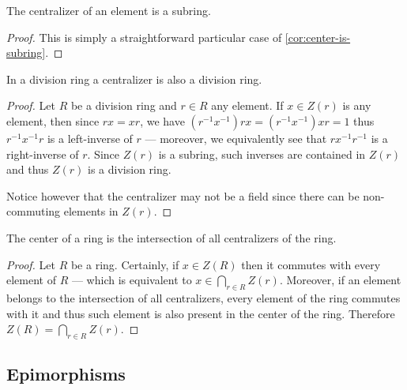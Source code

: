 %
\begin{corollary}
\label{cor:centralizer-is-subring}
The centralizer of an element is a subring.
\end{corollary}
%

%
\begin{proof}
This is simply a straightforward particular case of
\cref{cor:center-is-subring}.
\end{proof}
%

%
\begin{corollary}
\label{cor:division-ring-centralizer-is-division-ring}
In a division ring a centralizer is also a division ring.
\end{corollary}
%

%
\begin{proof}
Let \(R\) be a division ring and \(r \in R\) any element. If \(x \in Z(r)\) is
any element, then since \(r x = x r\), we have \((r^{-1} x^{-1}) r x = (r^{-1}
x^{-1}) x r = 1\) thus \(r^{-1} x^{-1} r\) is a left-inverse of \(r\) ---
moreover, we equivalently see that \(r x^{-1} r^{-1}\) is a right-inverse of
\(r\). Since \(Z(r)\) is a subring, such inverses are contained in \(Z(r)\) and
thus \(Z(r)\) is a division ring.

Notice however that the centralizer may not be a field since there can be
non-commuting elements in \(Z(r)\).
\end{proof}
%

%
\begin{corollary}
\label{cor:center-is-intersection-of-all-centralizers}
The center of a ring is the intersection of all centralizers of the ring.
\end{corollary}
%

%
\begin{proof}
Let \(R\) be a ring. Certainly, if \(x \in Z(R)\) then it commutes with every
element of \(R\) --- which is equivalent to \(x \in \bigcap_{r \in R}
Z(r)\). Moreover, if an element belongs to the intersection of all centralizers,
every element of the ring commutes with it and thus such element is also present
in the center of the ring. Therefore \(Z(R) = \bigcap_{r \in R} Z(r)\).
\end{proof}
%

\subsection{Epimorphisms}

